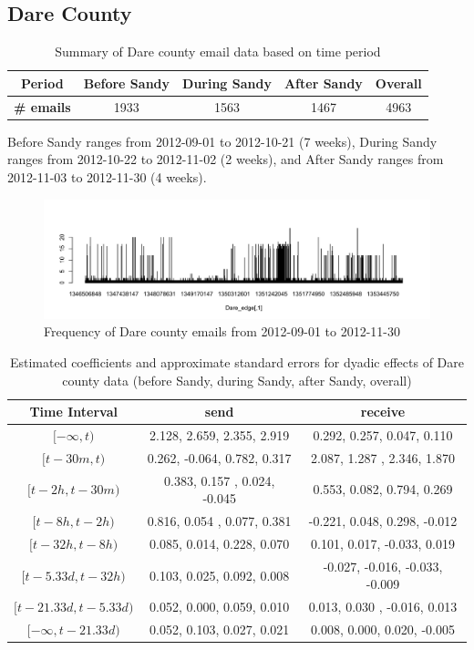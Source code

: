 \documentclass[a4paper]{article}
\begin{document}
\subsection{Dare County}
\footnotesize
\begin{table}[ht]
	\centering
	\begin{tabular}{ |c|ccc|c| } 
		\hline 
		\textbf{Period} &\textbf{Before Sandy} & \textbf{During Sandy} & \textbf{After Sandy} & \textbf{Overall} \\ 	\hline
			\textbf{\# emails}& 1933 & 1563 & 1467 & 4963 \\ 
		\hline
	\end{tabular}
	\caption{ Summary of Dare county email data based on time period}
	\label{table:nullDare2}
\end{table}
\normalsize
Before Sandy ranges from 2012-09-01 to 2012-10-21 (7 weeks), During Sandy ranges from 2012-10-22 to 2012-11-02 (2 weeks), and After Sandy ranges from 2012-11-03 to 2012-11-30 (4 weeks).
\footnotesize
\begin{figure}[ht]
	\centering
	\includegraphics[width=1.1\textwidth]{DareEmails.pdf} 
	\caption{Frequency of Dare county emails from 2012-09-01 to 2012-11-30  }
	\label{fig:Emailplots}
\end{figure}
\begin{table}[ht]
	\centering
	\begin{tabular}{ |c|cc| } 
		\hline 
		\textbf{Time Interval} &\textbf{send} & \textbf{receive} \\ 	
		\hline  $[-\infty, t)$&  2.128, 2.659, 2.355, 2.919& 0.292, 0.257, 0.047, 0.110\\  $[t-30 m, t)$ &  0.262, -0.064, 0.782, 0.317 &2.087, 1.287 , 2.346, 1.870\\  $[t-2h, t-30m)$& 0.383, 0.157 , 0.024, -0.045 &0.553, 0.082, 0.794, 0.269\\ $[t-8h, t-2h)$ & 0.816, 0.054 , 0.077, 0.381 &-0.221, 0.048, 0.298, -0.012 \\ $[t-32h, t-8h)$& 0.085, 0.014,  0.228, 0.070 &0.101, 0.017, -0.033, 0.019\\ $[t-5.33d, t-32h)$&  0.103, 0.025, 0.092, 0.008 &-0.027, -0.016, -0.033, -0.009 \\ $[t-21.33d, t-5.33d)$  & 0.052, 0.000, 0.059, 0.010& 0.013, 0.030 , -0.016, 0.013\\ 
		$[-\infty, t-21.33d)$  & 0.052, 0.103, 0.027, 0.021  & 0.008, 0.000, 0.020, -0.005\\
		\hline
	\end{tabular}
	\caption {Estimated coefficients and approximate standard errors for dyadic effects of Dare county data (before Sandy, during Sandy, after Sandy, overall)}
	\label{table:nullDare}
\end{table}
\end{document}
